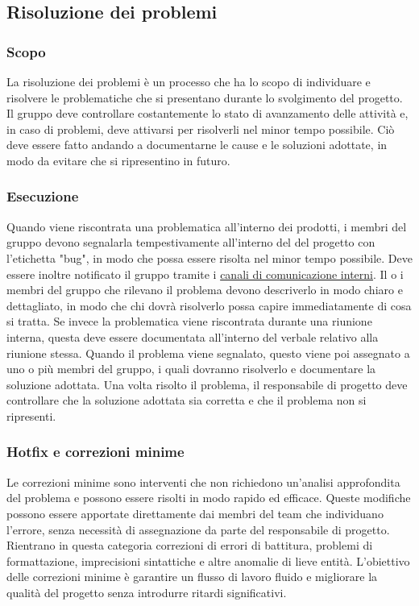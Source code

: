 \subsection{Risoluzione dei problemi}
\label{subsection:risoluzione_problemi}

\subsubsection{Scopo}
La risoluzione dei problemi è un processo che ha lo scopo di individuare e risolvere le problematiche che si presentano durante lo svolgimento del progetto.
Il gruppo deve controllare costantemente lo stato di avanzamento delle attività e, in caso di problemi, deve attivarsi per risolverli nel minor tempo possibile.
Ciò deve essere fatto andando a documentarne le cause e le soluzioni adottate, in modo da evitare che si ripresentino in futuro.

\subsubsection{Esecuzione}
Quando viene riscontrata una problematica all'interno dei prodotti, i membri del gruppo devono segnalarla tempestivamente all'interno del  del progetto con l'etichetta "bug", in modo che possa essere risolta nel minor tempo possibile.
Deve essere inoltre notificato il gruppo tramite i \hyperref[subpar:canali_interni]{canali di comunicazione interni}.
Il o i membri del gruppo che rilevano il problema devono descriverlo in modo chiaro e dettagliato, in modo che chi dovrà risolverlo possa capire immediatamente di cosa si tratta.
Se invece la problematica viene riscontrata durante una riunione interna, questa deve essere documentata all'interno del verbale relativo alla riunione stessa. 
Quando il problema viene segnalato, questo viene poi assegnato a uno o più membri del gruppo, i quali dovranno risolverlo e documentare la soluzione adottata.
Una volta risolto il problema, il responsabile di progetto deve controllare che la soluzione adottata sia corretta e che il problema non si ripresenti.

\subsubsection{Hotfix e correzioni minime}
Le correzioni minime sono interventi che non richiedono un'analisi approfondita del problema e possono essere risolti in modo rapido ed efficace. Queste modifiche possono essere apportate direttamente dai membri del team che individuano l'errore, senza necessità di assegnazione da parte del responsabile di progetto.  
Rientrano in questa categoria correzioni di errori di battitura, problemi di formattazione, imprecisioni sintattiche e altre anomalie di lieve entità. L'obiettivo delle correzioni minime è garantire un flusso di lavoro fluido e migliorare la qualità del progetto senza introdurre ritardi significativi. 


